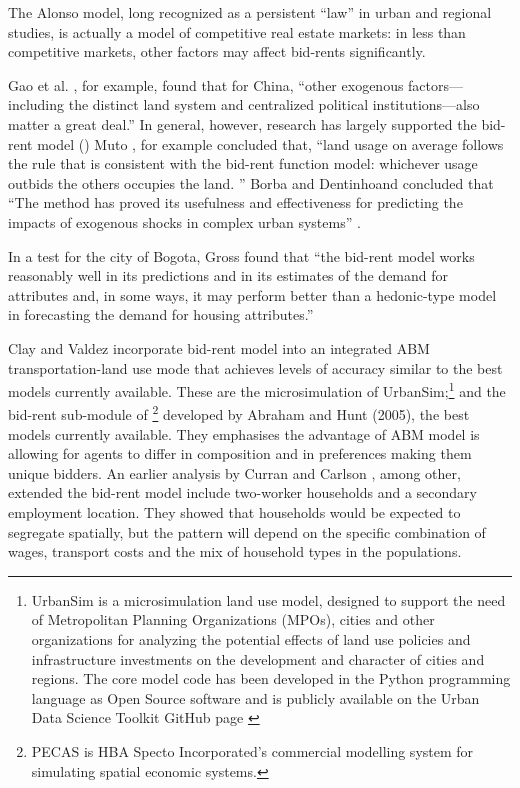 The Alonso model, long  recognized as a persistent ``law'' in urban and regional studies, 
is actually a model of competitive real estate markets: in less than competitive markets, other factors may affect bid-rents significantly.

Gao et al. \cite{GaoJinlong2020BtbT}, for example,  found  that for China, ``other exogenous  factors---including the distinct land system  and centralized political institutions---also matter a great deal.'' In general, however, 
research has largely supported the bid-rent model (\cite{mutoEstimationBidRent2006, wheatonBidRentApproach1977}) Muto \cite{mutoEstimationBidRent2006}, for example concluded that,  ``land usage on average follows the rule that is consistent with the bid-rent function model: whichever usage outbids the others occupies the land. ''  Borba and Dentinhoand concluded that ``The method has proved its usefulness and effectiveness for predicting the impacts of exogenous shocks in complex urban systems'' \cite{borbaEvaluationUrbanScenarios2016}.  

In a test for the city of Bogota, Gross \cite{grossEstimatingWillingnessPay1988} found that ``the bid-rent model works reasonably well in its predictions and in its estimates of the demand for attributes and, in some ways, it may perform better than a hedonic-type model in forecasting the demand for housing attributes.'' 

Clay and Valdez incorporate bid-rent model into an integrated ABM transportation-land use mode that achieves levels of accuracy similar to the best models currently available. These are the microsimulation of UrbanSim;\footnote{UrbanSim is a microsimulation land use model, designed to support the need of Metropolitan Planning Organizations (MPOs), cities and other organizations for analyzing the potential effects of land use policies and infrastructure investments on the development and character of cities and regions. The core model code has been developed in the Python programming language as Open Source software and is publicly available on the Urban Data Science Toolkit GitHub page \cite{waddellmodellinurbandev2002}} and the bid-rent sub-module of \footnote{PECAS is  HBA Specto Incorporated's commercial modelling system  for simulating spatial economic systems.} developed by Abraham and Hunt (2005), the best models currently available. They emphasises the advantage of ABM model is allowing for agents to differ in composition and in preferences making them unique bidders. 
An earlier analysis by Curran and Carlson \cite{curranTheoryResidentialLocation1982}, among other, extended the bid-rent model include two-worker households and a secondary employment location. They showed that households would be expected to segregate spatially, but the pattern will depend on the specific combination of wages, transport costs and the mix of household types in the populations. 

